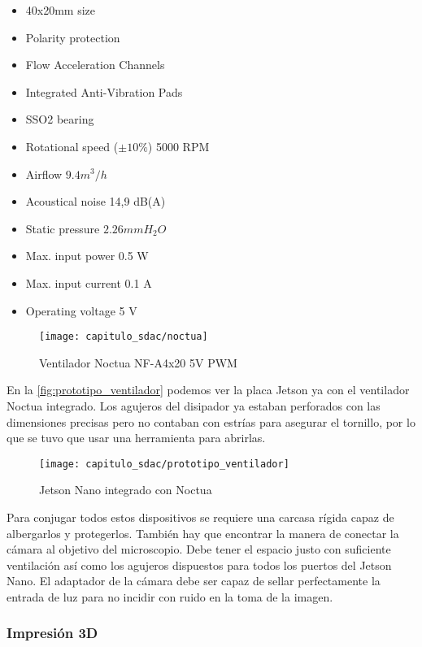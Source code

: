 \begin{itemize}
    \item 40x20mm size
    \item Polarity protection
    \item Flow Acceleration Channels
    \item Integrated Anti-Vibration Pads
    \item SSO2 bearing
    \item Rotational speed ($\pm 10\%$) 5000 RPM
    \item Airflow $9.4 m^{3}/h$
    \item Acoustical noise 14,9 dB(A)
    \item Static pressure $2.26 mm H_{2}O$
    \item Max. input power 0.5 W
    \item Max. input current 0.1 A    
    \item Operating voltage 5 V
\end{itemize}

\begin{figure}[H]
    \centering
    \texttt{[image: capitulo\_sdac/noctua]}
    \caption{Ventilador Noctua NF-A4x20 5V PWM}\label{fig:noctua}
\end{figure}

En la \autoref{fig:prototipo_ventilador} podemos ver la placa Jetson ya con el
ventilador Noctua integrado. Los agujeros del disipador ya estaban perforados
con las dimensiones precisas pero no contaban con estrías para asegurar el
tornillo, por lo que se tuvo que usar una herramienta para abrirlas.

\begin{figure}[H]
    \centering
    \texttt{[image: capitulo\_sdac/prototipo\_ventilador]}
    \caption{Jetson Nano integrado con Noctua}\label{fig:prototipo_ventilador}
\end{figure}

Para conjugar todos estos dispositivos se requiere una carcasa rígida capaz de
albergarlos y protegerlos. También hay que encontrar la manera de conectar la
cámara al objetivo del microscopio. Debe tener el espacio justo con suficiente
ventilación así como los agujeros dispuestos para todos los puertos del Jetson
Nano. El adaptador de la cámara debe ser capaz de sellar perfectamente la
entrada de luz para no incidir con ruido en la toma de la imagen.

\subsubsection{Impresión 3D}

